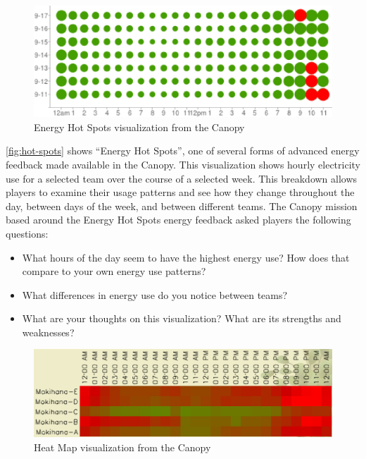 \documentclass[10pt, conference, compsocconf]{IEEEtran-old}
\begin{document}
\begin{figure}[!tb]
	\centering
	\includegraphics[width=\columnwidth]{hot-spots-crop2.eps}
	\caption{Energy Hot Spots visualization from the Canopy}
	\label{fig:hot-spots}
\end{figure}

\autoref{fig:hot-spots} shows ``Energy Hot Spots'', one of several forms of advanced energy feedback made available in the Canopy. This visualization shows hourly electricity use for a selected team over the course of a selected week. This breakdown allows players to examine their usage patterns and see how they change throughout the day, between days of the week, and between different teams. The Canopy mission based around the Energy Hot Spots energy feedback asked players the following questions:

\begin{itemize}
	\item What hours of the day seem to have the highest energy use? How does that compare to your own energy use patterns?
	\item What differences in energy use do you notice between teams?
	\item What are your thoughts on this visualization? What are its strengths and weaknesses?
\end{itemize}

\begin{figure}[!tb]
	\centering
	\includegraphics[width=\columnwidth]{heat-map.eps}
	\caption{Heat Map visualization from the Canopy}
	\label{fig:heat-map}
\end{figure}
\end{document}
